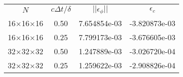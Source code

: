 \begin{tabular}{cccc}
     $N$ & $c\Delta t/\delta$  & $||\epsilon_{\phi}||$ & $\epsilon_{c}$  \\
16$\times$16$\times$16 & 0.50 & 7.654854e-03 & -3.820873e-03  \\
16$\times$16$\times$16 & 0.25 & 7.799173e-03 & -3.676605e-03  \\
32$\times$32$\times$32 & 0.50 & 1.247889e-03 & -3.026720e-04  \\
32$\times$32$\times$32 & 0.25 & 1.259622e-03 & -2.908826e-04  \\
\end{tabular}

